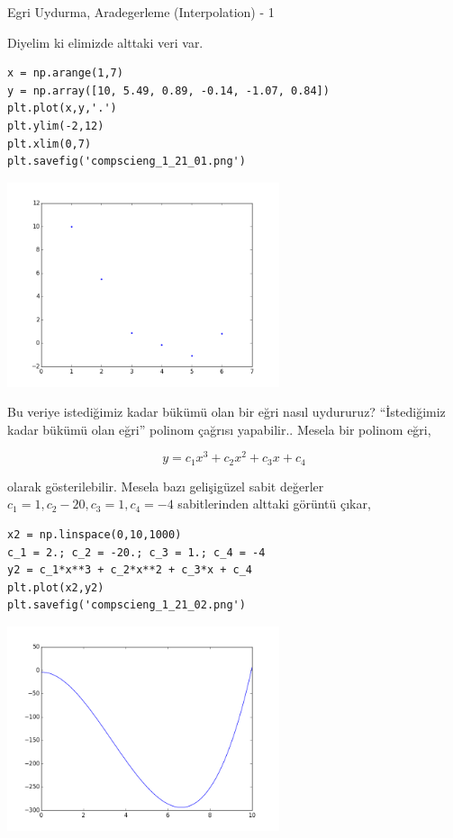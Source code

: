 \documentclass[12pt,fleqn]{article}\usepackage{../../common}
\begin{document}
Egri Uydurma, Aradegerleme (Interpolation) - 1

Diyelim ki elimizde alttaki veri var.

\begin{verbatim}
x = np.arange(1,7)
y = np.array([10, 5.49, 0.89, -0.14, -1.07, 0.84])
plt.plot(x,y,'.')
plt.ylim(-2,12)
plt.xlim(0,7)
plt.savefig('compscieng_1_21_01.png')
\end{verbatim}

\includegraphics[height=6cm]{compscieng_1_21_01.png}

Bu veriye istediğimiz kadar bükümü olan bir eğri nasıl uydururuz?
``İstediğimiz kadar bükümü olan eğri'' polinom çağrısı yapabilir.. Mesela
bir polinom eğri,

$$ y = c_1 x^3 + c_2x^2 + c_3x + c_4 $$

olarak gösterilebilir. Mesela bazı gelişigüzel sabit değerler
$c_1=1,c_2-20,c_3=1,c_4=-4$ sabitlerinden alttaki görüntü çıkar,

\begin{verbatim}
x2 = np.linspace(0,10,1000)
c_1 = 2.; c_2 = -20.; c_3 = 1.; c_4 = -4
y2 = c_1*x**3 + c_2*x**2 + c_3*x + c_4
plt.plot(x2,y2)
plt.savefig('compscieng_1_21_02.png')
\end{verbatim}

\includegraphics[height=6cm]{compscieng_1_21_02.png}
\end{document}
